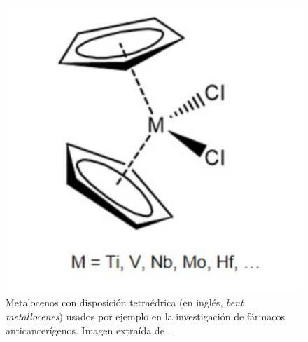 \begin{itemize}
        \begin{figure}[h!]
            \centering
            \includegraphics[scale=0.35]{imagenes/bent_metallocene.png}
            \caption{Metalocenos con disposición tetraédrica (en inglés, \textit{bent metallocenes}) usados por ejemplo en la investigación de fármacos anticancerígenos. Imagen extraída de \cite{bent_metallocenes}.}
            \label{fig:enter-label}
        \end{figure}
    
\end{itemize}
